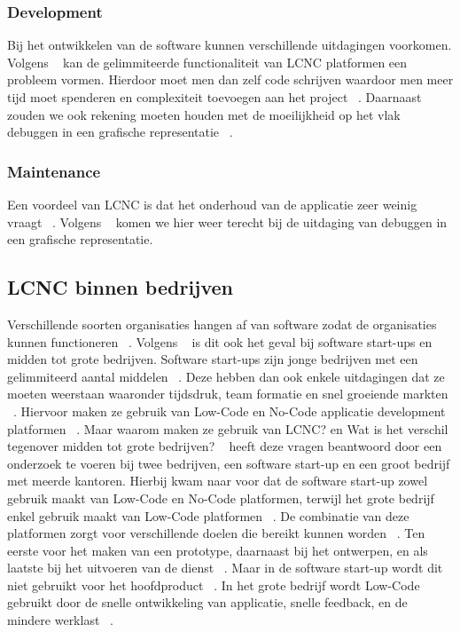 \subsubsection*{Development}
\label{sub:development}
Bij het ontwikkelen van de software kunnen verschillende uitdagingen voorkomen.
Volgens ~\textcite{Rokis_2022} kan de gelimmiteerde functionaliteit van LCNC platformen een probleem vormen.
Hierdoor moet men dan zelf code schrijven waardoor men meer tijd moet spenderen en complexiteit toevoegen aan het project ~\autocite{Rokis_2022}.
Daarnaast zouden we ook rekening moeten houden met de moeilijkheid op het vlak debuggen in een grafische representatie ~\autocite{Rokis_2022}.
\subsubsection*{Maintenance}
\label{sub:maintenance}
Een voordeel van LCNC is dat het onderhoud van de applicatie zeer weinig vraagt ~\autocite{Rokis_2022}.
Volgens ~\textcite{Rokis_2022} komen we hier weer terecht bij de uitdaging van debuggen in een grafische representatie.

\subsection*{LCNC binnen bedrijven}
\label{sub:lcnc-binnen-bedrijven}
Verschillende soorten organisaties hangen af van software zodat de organisaties kunnen functioneren ~\autocite{Hintsch2021}.
Volgens ~\textcite{Rafiq_2022} is dit ook het geval bij software start-ups en midden tot grote bedrijven. 
Software start-ups zijn jonge bedrijven met een gelimmiteerd aantal middelen ~\autocite{Rafiq_2022}. 
Deze hebben dan ook enkele uitdagingen dat ze moeten weerstaan waaronder tijdsdruk, team formatie en snel groeiende markten ~\autocite{Rafiq_2022}.
Hiervoor maken ze gebruik van Low-Code en No-Code applicatie development platformen ~\autocite{Rafiq_2022}. 
Maar waarom maken ze gebruik van LCNC? en Wat is het verschil tegenover midden tot grote bedrijven?
~\textcite{Rafiq_2022} heeft deze vragen beantwoord door een onderzoek te voeren bij twee bedrijven, een software start-up en een groot bedrijf met meerde kantoren.
Hierbij kwam naar voor dat de software start-up zowel gebruik maakt van Low-Code en No-Code platformen, terwijl het grote bedrijf enkel gebruik maakt van Low-Code platformen ~\textcite{Rafiq_2022}.
De combinatie van deze platformen zorgt voor verschillende doelen die bereikt kunnen worden ~\autocite{Rafiq_2022}.
Ten eerste voor het maken van een prototype, daarnaast bij het ontwerpen, en als laatste bij het uitvoeren van de dienst ~\autocite{Rafiq_2022}.
Maar in de software start-up wordt dit niet gebruikt voor het hoofdproduct ~\autocite{Rafiq_2022}. In het grote bedrijf wordt Low-Code
gebruikt door de snelle ontwikkeling van applicatie, snelle feedback, en de mindere werklast ~\autocite{Rafiq_2022}.
